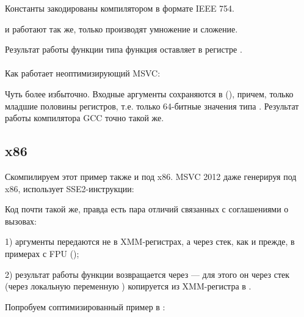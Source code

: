 Константы закодированы компилятором в формате IEEE 754.

 и  работают так же, только производят умножение и сложение.

Результат работы функции типа \Tdouble функция оставляет в регистре .\\
\\
Как работает неоптимизирующий MSVC:



Чуть более избыточно. 
Входные аргументы сохраняются в  (), 
причем, только младшие половины регистров, т.е. только 64-битные значения типа \Tdouble{}.
Результат работы компилятора GCC точно такой же.

\subsection{x86}

Скомпилируем этот пример также и под x86. MSVC 2012 даже генерируя под x86, использует SSE2-инструкции:





Код почти такой же, правда есть пара отличий связанных с соглашениями о вызовах:

1) аргументы передаются не в XMM-регистрах, а через стек, как и прежде, в примерах с FPU ();

2) результат работы функции возвращается через  --- для этого он через стек
(через локальную переменную ) копируется из XMM-регистра в .

\clearpage
Попробуем соптимизированный пример в \olly:

